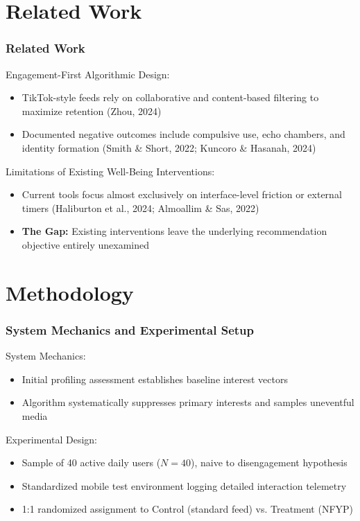 \documentclass{beamer}
\begin{document}
	\section{Related Work}
	
	\begin{frame}
		\frametitle{Related Work}
		Engagement-First Algorithmic Design:
		\begin{itemize}
			\item TikTok-style feeds rely on collaborative and content-based filtering to maximize retention (Zhou, 2024)
			\item Documented negative outcomes include compulsive use, echo chambers, and identity formation (Smith \& Short, 2022; Kuncoro \& Hasanah, 2024)
		\end{itemize}
		
		Limitations of Existing Well-Being Interventions:
		\begin{itemize}
			\item Current tools focus almost exclusively on interface-level friction or external timers (Haliburton et al., 2024; Almoallim \& Sas, 2022)
			\item \textbf{The Gap:} Existing interventions leave the underlying recommendation objective entirely unexamined
		\end{itemize}
	\end{frame}
	
	\section{Methodology}
	
	\begin{frame}
		\frametitle{System Mechanics and Experimental Setup}
		System Mechanics:
		\begin{itemize}
			\item Initial profiling assessment establishes baseline interest vectors
			\item Algorithm systematically suppresses primary interests and samples uneventful media
		\end{itemize}
		
		Experimental Design:
		\begin{itemize}
			\item Sample of 40 active daily users ($N = 40$), naive to disengagement hypothesis
			\item Standardized mobile test environment logging detailed interaction telemetry
			\item 1:1 randomized assignment to Control (standard feed) vs. Treatment (NFYP)
		\end{itemize}
	\end{frame}
	
\end{document}
